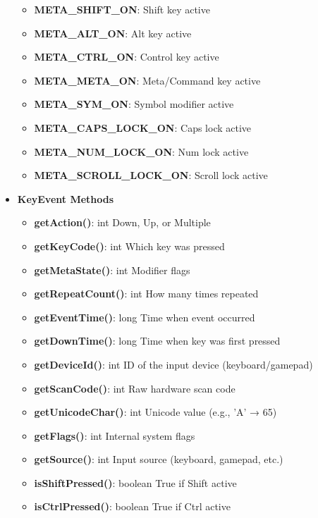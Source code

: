 \documentclass{report}
\begin{document}
\begin{itemize}
            \begin{itemize}
                \item \textbf{META\_SHIFT\_ON}:	Shift key active
                \item \textbf{META\_ALT\_ON}:	Alt key active
                \item \textbf{META\_CTRL\_ON}:	Control key active
                \item \textbf{META\_META\_ON}:	Meta/Command key active
                \item \textbf{META\_SYM\_ON}:	Symbol modifier active
                \item \textbf{META\_CAPS\_LOCK\_ON}:	Caps lock active
                \item \textbf{META\_NUM\_LOCK\_ON}:	Num lock active
                \item \textbf{META\_SCROLL\_LOCK\_ON}:	Scroll lock active
            \end{itemize}
        \item \textbf{KeyEvent Methods}
            \begin{itemize}
                \item \textbf{getAction()}:	int	Down, Up, or Multiple
                \item \textbf{getKeyCode()}:	int	Which key was pressed
                \item \textbf{getMetaState()}:	int	Modifier flags
                \item \textbf{getRepeatCount()}:	int	How many times repeated
                \item \textbf{getEventTime()}:	long	Time when event occurred
                \item \textbf{getDownTime()}:	long	Time when key was first pressed
                \item \textbf{getDeviceId()}:	int	ID of the input device (keyboard/gamepad)
                \item \textbf{getScanCode()}:	int	Raw hardware scan code
                \item \textbf{getUnicodeChar()}:	int	Unicode value (e.g., 'A' → 65)
                \item \textbf{getFlags()}:	int	Internal system flags
                \item \textbf{getSource()}:	int	Input source (keyboard, gamepad, etc.)
                \item \textbf{isShiftPressed()}:	boolean	True if Shift active
                \item \textbf{isCtrlPressed()}:	boolean	True if Ctrl active

\end{itemize}
\end{itemize}
\end{document}
